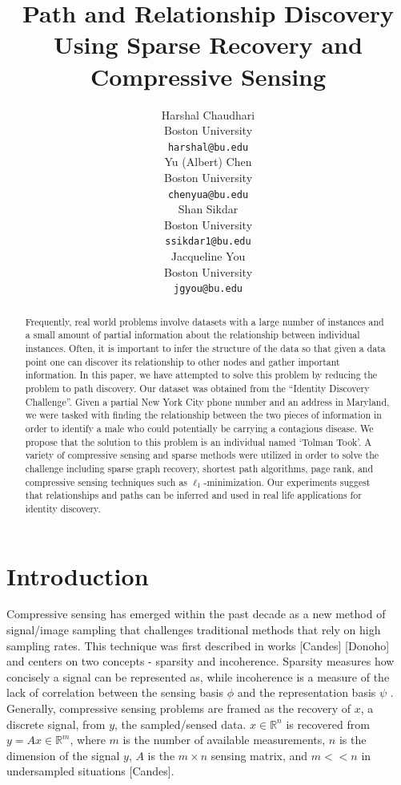 \documentclass{article} %
\title{Path and Relationship Discovery Using Sparse Recovery and Compressive Sensing}
\author{
Harshal Chaudhari\\
Boston University \\
\texttt{harshal@bu.edu} \\
\And
Yu (Albert) Chen\\
Boston University \\
\texttt{chenyua@bu.edu} \\
\And
Shan Sikdar\\
Boston University  \\
\texttt{ssikdar1@bu.edu} \\
\And
Jacqueline You\\
Boston University \\
\texttt{jgyou@bu.edu} \\
}
\begin{document}
\maketitle

\begin{abstract}
Frequently, real world problems involve datasets with a large number of instances and a small amount of partial information about the relationship between individual instances. Often, it is important to infer the structure of the data so that given a data point one can discover its relationship to other nodes and gather important information. In this paper, we have attempted to solve this problem by reducing the problem to path discovery.  Our dataset was obtained from the ``Identity Discovery Challenge”. Given a partial New York City phone number and an address in Maryland, we were tasked with finding the relationship between the two pieces of information in order to identify a male who could potentially be carrying a contagious disease. We propose that the solution to this problem is an individual named `Tolman Took'. A variety of compressive sensing and sparse methods were utilized in order to solve the challenge including sparse graph recovery, shortest path algorithms, page rank, and compressive sensing techniques such as $\ell_1$-minimization. Our experiments suggest that relationships and paths can be inferred and used in real life applications for identity discovery.
\end{abstract}


\section{Introduction}


Compressive sensing has emerged within the past decade as a new method of signal/image sampling that challenges traditional methods that rely on high sampling rates. This technique was first described in works [Candes] [Donoho] and centers on two concepts - sparsity and incoherence. Sparsity measures how concisely a signal can be represented as, while incoherence is a measure of the lack of correlation between the sensing basis $\phi$ and the representation basis $\psi$ . Generally, compressive sensing problems are framed as the recovery of $x$, a discrete signal, from $y$, the sampled/sensed data. $x \in  \mathbb{R}^n$ is recovered from $y=Ax \in  \mathbb{R}^m $, where $m$ is the number of available measurements, $n$ is the dimension of the signal $y$, $A$ is the $m \times n$ sensing matrix, and $m << n$  in undersampled situations [Candes].
\end{document}
